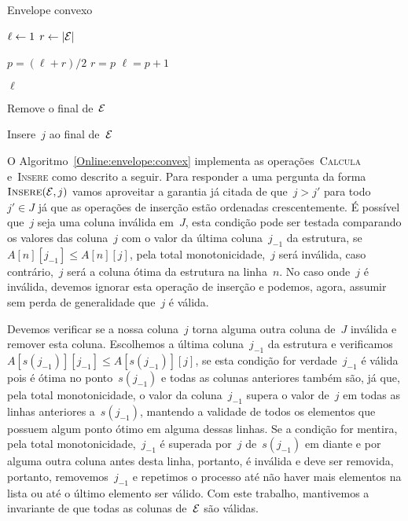 \begin{algorithm}[h]
\caption{Envelope convexo}
\label{Online:envelope:convex}
\begin{algorithmic}[1]
    \State $\ell \leftarrow 1$
    \State $r \leftarrow |\mathcal{E}|$
    
        \State $p = (\ell+r)/2$
            \State $r = p$
        \Else
            \State $\ell = p+1$
        \EndIf
    \EndWhile

    \State \Return $\ell$
\EndFunction

        \State \Return
    \EndIf
    
        \State Remove o final de~$\mathcal{E}$
    \EndWhile

    \State Insere~$j$ ao final de~$\mathcal{E}$
\EndFunction
\end{algorithmic}
\end{algorithm}

O Algoritmo~\ref{Online:envelope:convex} implementa as operações~\textsc{Calcula} e~\textsc{Insere} como descrito a seguir. Para responder a uma pergunta da forma~$\textsc{Insere}(\mathcal{E},j)$ vamos aproveitar a garantia já citada de que~$j > j'$ para todo~$j' \in J$ já que as operações de inserção estão ordenadas crescentemente. É possível que~$j$ seja uma coluna inválida em~$J$, esta condição pode ser testada comparando os valores das coluna~$j$ com o valor da última coluna~$j_{-1}$ da estrutura, se~${A[n][j_{-1}] \leq A[n][j]}$, pela total monotonicidade,~$j$ será inválida, caso contrário,~$j$ será a coluna ótima da estrutura na linha~$n$. No caso onde~$j$ é inválida, devemos ignorar esta operação de inserção e podemos, agora, assumir sem perda de generalidade que~$j$ é válida.

Devemos verificar se a nossa coluna~$j$ torna alguma outra coluna de~$J$ inválida e remover esta coluna. Escolhemos a última coluna~$j_{-1}$ da estrutura e verificamos~${A[s(j_{-1})][j_{-1}] \leq A[s(j_{-1})][j]}$, se esta condição for verdade~$j_{-1}$ é válida pois é ótima no ponto~$s(j_{-1})$ e todas as colunas anteriores também são, já que, pela total monotonicidade, o valor da coluna~$j_{-1}$ supera o valor de~$j$ em todas as linhas anteriores a~$s(j_{-1})$, mantendo a validade de todos os elementos que possuem algum ponto ótimo em alguma dessas linhas. Se a condição for mentira, pela total monotonicidade,~$j_{-1}$ é superada por~$j$ de~$s(j_{-1})$ em diante e por alguma outra coluna antes desta linha, portanto, é inválida e deve ser removida, portanto, removemos~$j_{-1}$ e repetimos o processo até não haver mais elementos na lista ou até o último elemento ser válido. Com este trabalho, mantivemos a invariante de que todas as colunas de~$\mathcal{E}$ são válidas.

